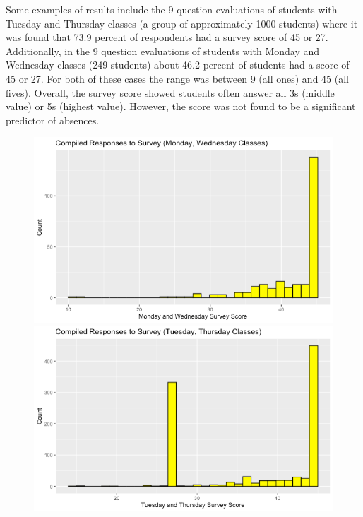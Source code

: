 \documentclass[12pt,letterpaper]{article}
\begin{document}
	Some examples of results include the 9 question evaluations of students with Tuesday and Thursday classes (a group of approximately 1000 students) where it was found that 73.9 percent of respondents had a survey score of 45 or 27. Additionally, in the 9 question evaluations of students with Monday and Wednesday classes (249 students) about 46.2 percent of students had a score of 45 or 27. For both of these cases the range was between 9 (all ones) and 45 (all fives). Overall, the survey score showed students often answer all 3s (middle value) or 5s (highest value). However, the score was not found to be a significant predictor of absences. 


\begin{figure}[!ht]
  \centering
  \begin{minipage}[b]{0.49\textwidth}
    \includegraphics[width=\textwidth]{Plots/MW Survey Score.png}
  \end{minipage}
  \hfill
  \begin{minipage}[b]{0.49\textwidth}
    \includegraphics[width=\textwidth]{Plots/TTH Survey Score.png}
  \end{minipage}
\end{figure}
\end{document}
